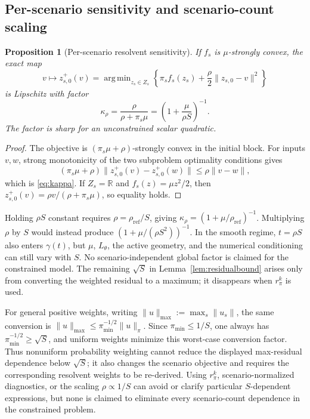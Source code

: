 \documentclass[preprint,12pt,3p]{elsarticle}
\newtheorem{proposition}[theorem]{Proposition}
\theoremstyle{definition}
\DeclareMathOperator*{\argmin}{arg\,min}
\begin{document}
\subsection{Per-scenario sensitivity and scenario-count scaling}
\begin{proposition}[Per-scenario resolvent sensitivity]\label{prop:sensitivity}
If $f_s$ is $\mu$-strongly convex, the exact map
\[
v\mapsto z_{s,0}^+(v)=\argmin_{z_s\in Z_s}\left\{\pi_s f_s(z_s)+\frac{\rho}{2}\|z_{s,0}-v\|^2\right\}
\]
is Lipschitz with factor
\begin{equation}
\kappa_\rho=\frac{\rho}{\rho+\pi_s\mu}=\left(1+\frac{\mu}{\rho S}\right)^{-1}.
\label{eq:kappa}
\end{equation}
The factor is sharp for an unconstrained scalar quadratic.
\end{proposition}
\begin{proof}
The objective is $(\pi_s\mu+\rho)$-strongly convex in the initial block. For inputs $v,w$, strong monotonicity of the two subproblem optimality conditions gives
\[
(\pi_s\mu+\rho)\|z_{s,0}^+(v)-z_{s,0}^+(w)\|\leq\rho\|v-w\|,
\]
which is \eqref{eq:kappa}. If $Z_s=\mathbb R$ and $f_s(z)=\mu z^2/2$, then $z_{s,0}^+(v)=\rho v/(\rho+\pi_s\mu)$, so equality holds.
\end{proof}
Holding $\rho S$ constant requires $\rho=\rho_{\mathrm{ref}}/S$, giving $\kappa_\rho=(1+\mu/\rho_{\mathrm{ref}})^{-1}$. Multiplying $\rho$ by $S$ would instead produce $(1+\mu/(\rho S^2))^{-1}$. In the smooth regime, $t=\rho S$ also enters $\gamma(t)$, but $\mu$, $L_\theta$, the active geometry, and the numerical conditioning can still vary with $S$. No scenario-independent global factor is claimed for the constrained model. The remaining $\sqrt S$ in Lemma~\ref{lem:residualbound} arises only from converting the weighted residual to a maximum; it disappears when $r_\pi^k$ is used.

For general positive weights, writing $\|u\|_{\max}:=\max_s\|u_s\|$, the same conversion is $\|u\|_{\max}\leq\pi_{\min}^{-1/2}\|u\|_\pi$. Since $\pi_{\min}\leq1/S$, one always has $\pi_{\min}^{-1/2}\geq\sqrt S$, and uniform weights minimize this worst-case conversion factor. Thus nonuniform probability weighting cannot reduce the displayed max-residual dependence below $\sqrt S$; it also changes the scenario objective and requires the corresponding resolvent weights to be re-derived. Using $r_\pi^k$, scenario-normalized diagnostics, or the scaling $\rho\propto1/S$ can avoid or clarify particular $S$-dependent expressions, but none is claimed to eliminate every scenario-count dependence in the constrained problem.
\end{document}
